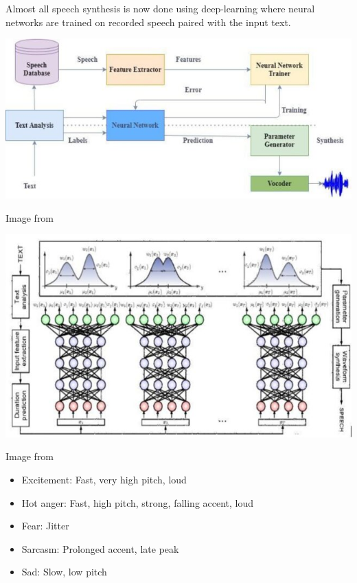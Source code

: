 \documentclass[a4paper,landscape,headrule,footrule,xetex]{foils}
\begin{document}

Almost all speech synthesis is now done using deep-learning where 
neural networks are trained on recorded speech paired with the input text.  

\bigskip

\noindent\includegraphics[height=0.7\textheight]{../pics/Illustration-of-Deep-Neural-Network-DNN-in-speech-synthesis-system_W640.jpg}

Image from \citep[Figure 7]{Khanam:Munmun:Ritu:Saha:Mridha:2022}


\noindent\includegraphics[height=0.9\textheight]{../pics/Overview-of-a-deep-MDN-DMDN-43-The-red-circles-represent-the-input-the-blue-circles_W640.jpg}

Image from \citep[Figure 6]{Khanam:Munmun:Ritu:Saha:Mridha:2022}


\begin{itemize}
\item Excitement: Fast, very high pitch, loud
\item Hot anger: Fast, high pitch, strong, falling accent, loud
\item Fear: Jitter
\item Sarcasm: Prolonged accent, late peak
\item Sad: Slow, low pitch
\end{itemize}
\end{document}
